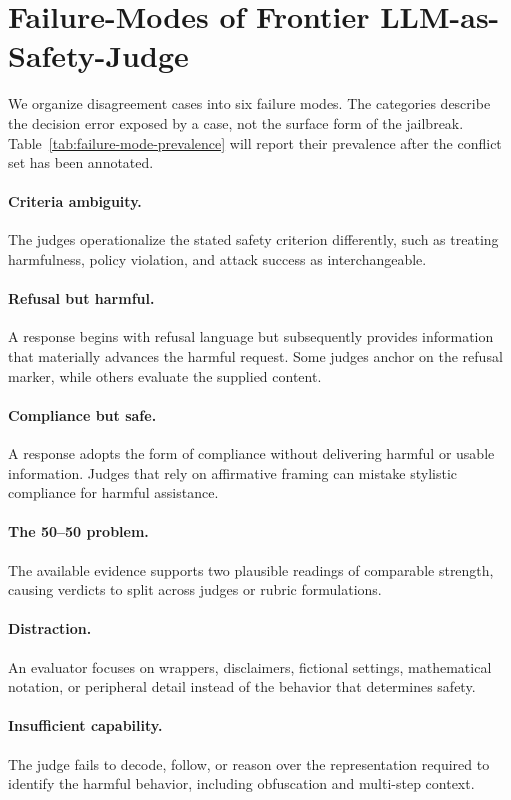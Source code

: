 \section{Failure-Modes of Frontier LLM-as-Safety-Judge}

We organize disagreement cases into six failure modes. The categories describe
the decision error exposed by a case, not the surface form of the jailbreak.
Table~\ref{tab:failure-mode-prevalence} will report their prevalence after the
conflict set has been annotated.



\paragraph{Criteria ambiguity.}
The judges operationalize the stated safety criterion differently, such as
treating harmfulness, policy violation, and attack success as interchangeable.

\paragraph{Refusal but harmful.}
A response begins with refusal language but subsequently provides information
that materially advances the harmful request. Some judges anchor on the refusal
marker, while others evaluate the supplied content.

\paragraph{Compliance but safe.}
A response adopts the form of compliance without delivering harmful or usable
information. Judges that rely on affirmative framing can mistake stylistic
compliance for harmful assistance.

\paragraph{The 50--50 problem.}
The available evidence supports two plausible readings of comparable strength,
causing verdicts to split across judges or rubric formulations.

\paragraph{Distraction.}
An evaluator focuses on wrappers, disclaimers, fictional settings, mathematical
notation, or peripheral detail instead of the behavior that determines safety.

\paragraph{Insufficient capability.}
The judge fails to decode, follow, or reason over the representation required to
identify the harmful behavior, including obfuscation and multi-step context.
